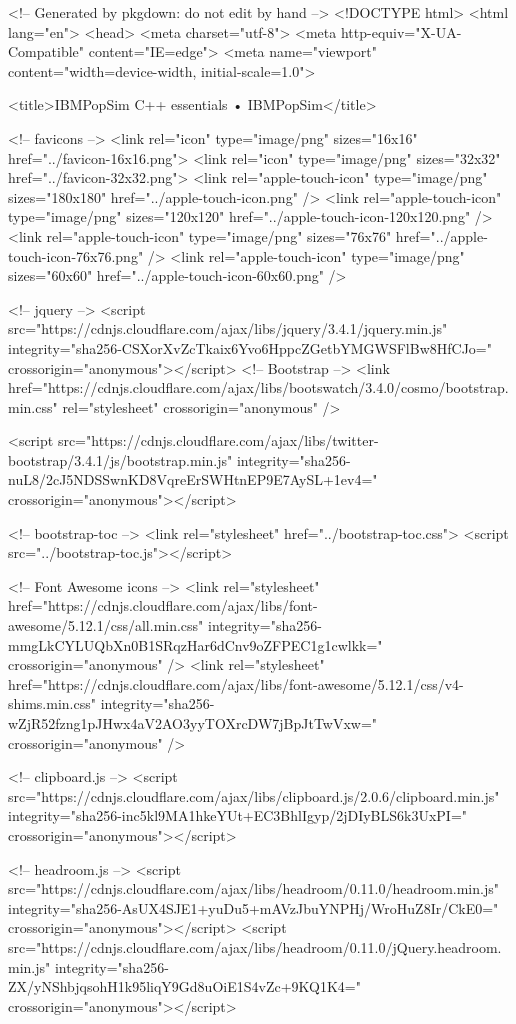<!-- Generated by pkgdown: do not edit by hand -->
<!DOCTYPE html>
<html lang="en">
  <head>
  <meta charset="utf-8">
<meta http-equiv="X-UA-Compatible" content="IE=edge">
<meta name="viewport" content="width=device-width, initial-scale=1.0">

<title>IBMPopSim C++ essentials • IBMPopSim</title>

<!-- favicons -->
<link rel="icon" type="image/png" sizes="16x16" href="../favicon-16x16.png">
<link rel="icon" type="image/png" sizes="32x32" href="../favicon-32x32.png">
<link rel="apple-touch-icon" type="image/png" sizes="180x180" href="../apple-touch-icon.png" />
<link rel="apple-touch-icon" type="image/png" sizes="120x120" href="../apple-touch-icon-120x120.png" />
<link rel="apple-touch-icon" type="image/png" sizes="76x76" href="../apple-touch-icon-76x76.png" />
<link rel="apple-touch-icon" type="image/png" sizes="60x60" href="../apple-touch-icon-60x60.png" />

<!-- jquery -->
<script src="https://cdnjs.cloudflare.com/ajax/libs/jquery/3.4.1/jquery.min.js" integrity="sha256-CSXorXvZcTkaix6Yvo6HppcZGetbYMGWSFlBw8HfCJo=" crossorigin="anonymous"></script>
<!-- Bootstrap -->
<link href="https://cdnjs.cloudflare.com/ajax/libs/bootswatch/3.4.0/cosmo/bootstrap.min.css" rel="stylesheet" crossorigin="anonymous" />


<script src="https://cdnjs.cloudflare.com/ajax/libs/twitter-bootstrap/3.4.1/js/bootstrap.min.js" integrity="sha256-nuL8/2cJ5NDSSwnKD8VqreErSWHtnEP9E7AySL+1ev4=" crossorigin="anonymous"></script>

<!-- bootstrap-toc -->
<link rel="stylesheet" href="../bootstrap-toc.css">
<script src="../bootstrap-toc.js"></script>

<!-- Font Awesome icons -->
<link rel="stylesheet" href="https://cdnjs.cloudflare.com/ajax/libs/font-awesome/5.12.1/css/all.min.css" integrity="sha256-mmgLkCYLUQbXn0B1SRqzHar6dCnv9oZFPEC1g1cwlkk=" crossorigin="anonymous" />
<link rel="stylesheet" href="https://cdnjs.cloudflare.com/ajax/libs/font-awesome/5.12.1/css/v4-shims.min.css" integrity="sha256-wZjR52fzng1pJHwx4aV2AO3yyTOXrcDW7jBpJtTwVxw=" crossorigin="anonymous" />

<!-- clipboard.js -->
<script src="https://cdnjs.cloudflare.com/ajax/libs/clipboard.js/2.0.6/clipboard.min.js" integrity="sha256-inc5kl9MA1hkeYUt+EC3BhlIgyp/2jDIyBLS6k3UxPI=" crossorigin="anonymous"></script>

<!-- headroom.js -->
<script src="https://cdnjs.cloudflare.com/ajax/libs/headroom/0.11.0/headroom.min.js" integrity="sha256-AsUX4SJE1+yuDu5+mAVzJbuYNPHj/WroHuZ8Ir/CkE0=" crossorigin="anonymous"></script>
<script src="https://cdnjs.cloudflare.com/ajax/libs/headroom/0.11.0/jQuery.headroom.min.js" integrity="sha256-ZX/yNShbjqsohH1k95liqY9Gd8uOiE1S4vZc+9KQ1K4=" crossorigin="anonymous"></script>

